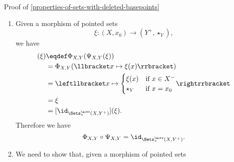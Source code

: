 \begin{Proof}{Proof of \cref{properties-of-sets-with-deleted-basepoints}}
\begin{enumerate}
\begin{align*}
                                                 &\eqdef \Psi_{X,Y}(\leftllbracket x\mapsto{\begin{cases}\xi(x)&\text{if $x\in X^{-}$}\\\star_{Y}&\text{if $x=x_{0}$}\end{cases}}\rightrrbracket)\\%
                                                 &=      \llbracket x\mapsto\xi(x)\rrbracket\\
                                                 &=      \xi\\
                                                 &=      [\id_{\Sets(X^{-},Y)}](\xi).
            \end{align*}
            Therefore we have
            \[
                \Psi_{X,Y}\circ\Phi_{X,Y}%
                =%
                \id_{\Sets(X^{-},Y)}.%
            \]%
        \item\label{proof-of-properties-of-sets-with-deleted-basepoints-adjoint-equivalence-4}Given a morphism of pointed sets
            \[
                \xi%
                \colon%
                (X,x_{0})%
                \to%
                (Y^{+},\star_{Y}),%
            \]%
            we have
            \begin{align*}
                [\Phi_{X,Y}\circ\Psi_{X,Y}](\xi) &\eqdef \Phi_{X,Y}(\Psi_{X,Y}(\xi))\\%
                                                 &=      \Phi_{X,Y}(\llbracket x\mapsto\xi(x)\rrbracket)\\%
                                                 &=      \leftllbracket x\mapsto{\begin{cases}\xi(x)&\text{if $x\in X^{-}$}\\\star_{Y}&\text{if $x=x_{0}$}\end{cases}}\rightrrbracket\\
                                                 &=      \xi\\
                                                 &=      [\id_{\Sets^{\actv}_{*}(X,Y^{+})}](\xi).
            \end{align*}
            Therefore we have
            \[
                \Phi_{X,Y}\circ\Psi_{X,Y}%
                =%
                \id_{\Sets^{\actv}_{*}(X,Y^{+})}.%
            \]%
        \item\label{proof-of-properties-of-sets-with-deleted-basepoints-adjoint-equivalence-5}We need to show that, given a morphism of pointed sets

\end{enumerate}
\end{Proof}

